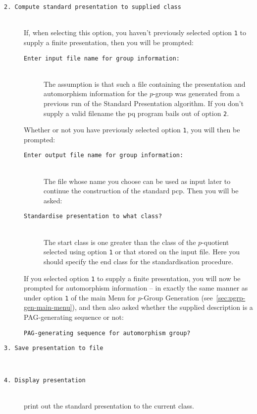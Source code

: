 \documentclass[12pt]{article}
\begin{document}
\begin{description}
\item[\texttt{2.\ Compute standard presentation to supplied class}]\ \\
 If, when selecting this option, you haven't previously selected 
 option \texttt{1} to supply a finite presentation, then
 you will be prompted:
 \begin{description}
  \item[\texttt{Enter input file name for group information:}]\ \\
   The assumption is that such a file containing the presentation and
   automorphism information for the $p$-group was generated from a previous
   run of the Standard Presentation algorithm. If you don't supply a
   valid filename the pq program bails out of option \texttt{2}.
 \end{description}
 Whether or not you have previously selected option \texttt{1},
 you will then be prompted:
 \begin{description}
  \item[\texttt{Enter output file name for group information:}]\ \\
   The file whose name you choose can be used as input
   later to continue the construction of the standard pcp.
   Then you will be asked:
  \item[\texttt{Standardise presentation to what class?}]\ \\
   The start class is one greater than the class of the $p$-quotient
   selected using option \texttt{1} or that stored on the input file.
   Here you should specify the end class for the standardisation procedure.
 \end{description}
 If you selected option \texttt{1} to supply a finite presentation, 
 you will now be prompted for automorphism information --
 in exactly the same manner as under option \texttt{1} of
 the main Menu for $p$-Group Generation (see~\ref{sec:pgrp-gen-main-menu}),
 and then also asked whether the supplied description
 is a PAG-generating sequence or not:
 \begin{description}
  \item[\texttt{PAG-generating sequence for automorphism group?}]
 \end{description}
\item[\texttt{3.\ Save presentation to file}]\ \\
\item[\texttt{4.\ Display presentation}]\ \\
 print out the standard presentation to the current class.


\end{description}
\end{document}
